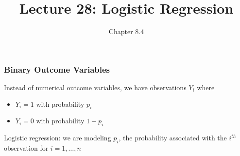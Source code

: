\documentclass[slides]{beamer}
\title{Lecture 28: Logistic Regression}
\author{Chapter 8.4}
\date{}
\newcommand{\blue}[1]{\textcolor{blue2}{#1}}
\begin{document}
\begin{frame}
\titlepage
\end{frame}



%
%
%
%
%
%
%










\begin{frame}[fragile]
\frametitle{Binary Outcome Variables}

Instead of numerical outcome variables, we have observations $Y_i$ where
\begin{itemize}
\item $Y_i=1$ with probability $p_i$
\item $Y_i=0$ with probability $1-p_i$
\end{itemize}

\vspace{0.5cm}
\pause
\blue{Logistic regression}: we are modeling $p_i$, the probability associated with the $i^{th}$ observation for $i=1,\ldots,n$

\end{frame}
\end{document}
